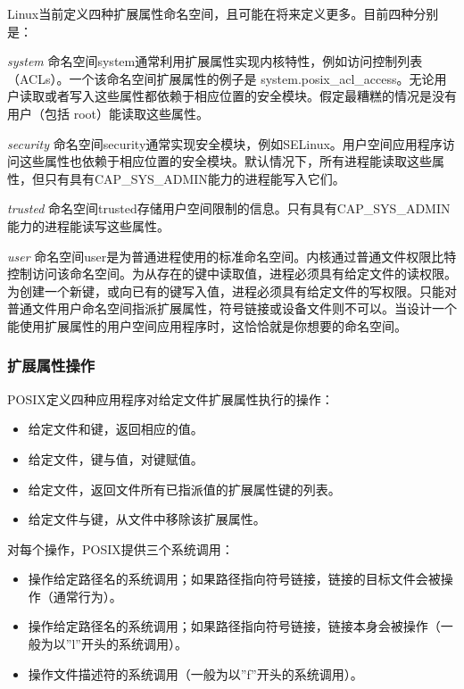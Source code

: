 Linux当前定义四种扩展属性命名空间，且可能在将来定义更多。目前四种分别是： 

\begin{eqlist*}
\item[\emph{system}] 命名空间system通常利用扩展属性实现内核特性，例如访问控制列表（ACLs）。一个该命名空间扩展属性的例子是 system.posix\_acl\_access。无论用户读取或者写入这些属性都依赖于相应位置的安全模块。假定最糟糕的情况是没有用户（包括 root）能读取这些属性。
\item[\emph{security}] 命名空间security通常实现安全模块，例如SELinux。用户空间应用程序访问这些属性也依赖于相应位置的安全模块。默认情况下，所有进程能读取这些属性，但只有具有CAP\_SYS\_ADMIN能力的进程能写入它们。 
\item[\emph{trusted}] 命名空间trusted存储用户空间限制的信息。只有具有CAP\_SYS\_ADMIN能力的进程能读写这些属性。
\item[\emph{user}] 命名空间user是为普通进程使用的标准命名空间。内核通过普通文件权限比特控制访问该命名空间。为从存在的键中读取值，进程必须具有给定文件的读权限。为创建一个新键，或向已有的键写入值，进程必须具有给定文件的写权限。只能对普通文件用户命名空间指派扩展属性，符号链接或设备文件则不可以。当设计一个能使用扩展属性的用户空间应用程序时，这恰恰就是你想要的命名空间。 
\end{eqlist*}

\subsubsection{扩展属性操作}

POSIX定义四种应用程序对给定文件扩展属性执行的操作：

\begin{itemize}
\item 给定文件和键，返回相应的值。
\item 给定文件，键与值，对键赋值。
\item 给定文件，返回文件所有已指派值的扩展属性键的列表。
\item 给定文件与键，从文件中移除该扩展属性。
\end{itemize}

对每个操作，POSIX提供三个系统调用：

\begin{itemize}
\item 操作给定路径名的系统调用；如果路径指向符号链接，链接的目标文件会被操作（通常行为）。
\item 操作给定路径名的系统调用；如果路径指向符号链接，链接本身会被操作（一般为以''l''开头的系统调用）。
\item 操作文件描述符的系统调用（一般为以''f''开头的系统调用）。 
\end{itemize}


